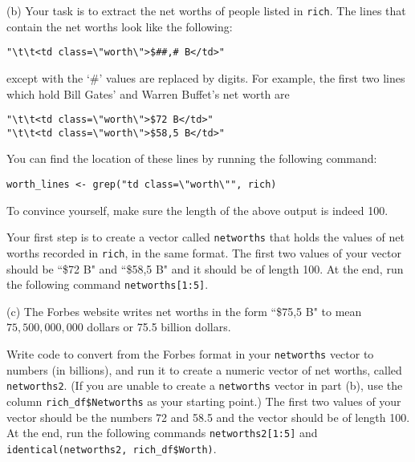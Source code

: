\documentclass[12pt, leqno]{article}
\begin{document}
\vspace{1.5 cm}

(b)  Your task is to extract the net worths of people listed in \texttt{rich}.  The lines that contain the net worths look like the following:
\begin{verbatim}
"\t\t<td class=\"worth\">$##,# B</td>"
\end{verbatim}  
except with the `\#' values are replaced by digits.  For example, the first two lines which hold Bill Gates' and Warren Buffet's net worth are
\begin{verbatim}
"\t\t<td class=\"worth\">$72 B</td>"
"\t\t<td class=\"worth\">$58,5 B</td>"
\end{verbatim}

\vspace{.5 cm}

You can find the location of these lines by running the following command:
\begin{verbatim}
worth_lines <- grep("td class=\"worth\"", rich)
\end{verbatim}
To convince yourself, make sure the length of the above output is indeed 100.  

\vspace{.5 cm}
Your first step is to create a vector called \texttt{networths} that holds the values of net worths recorded in \texttt{rich}, in the same format.  The first two values of your vector should be ``\$72 B" and ``\$58,5 B" and it should be of length 100.  At the end, run the following command \texttt{networths[1:5]}.

\vspace{1.5 cm}

(c)  The Forbes website writes net worths in the form ``\$75,5 B" to mean $75,500,000,000$ dollars or 75.5 billion dollars. 

\vspace{.5 cm}

Write code to convert from the Forbes format in your \texttt{networths} vector to numbers (in billions), and run it to create a numeric vector of net worths, called \texttt{networths2}.  (If you are unable to create a \texttt{networths} vector in part (b), use the column \texttt{rich\_df\$Networths} as your starting point.)  The first two values of your vector should be the numbers 72 and 58.5 and the vector should be of length 100.  At the end, run the following commands \texttt{networths2[1:5]} and \texttt{identical(networths2, rich\_df\$Worth)}.

\vspace{1.5 cm}
\end{document}
